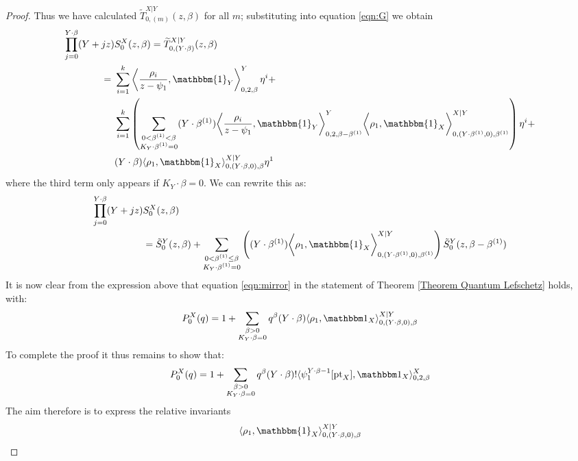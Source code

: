\documentclass[10pt]{amsart}
\newcommand{\pt}{\operatorname{pt}}
\theoremstyle{definition}
\theoremstyle{definition}
\begin{document}
\begin{proof}
Thus we have calculated $\widetilde{T}_{0,(m)}^{X|Y}(z,\beta)$ for all $m$; substituting into equation \eqref{eqn:G} we obtain
\begin{align*} \prod_{j=0}^{Y \cdot \beta} (Y + jz) & S_0^X(z,\beta) = \widetilde{T}_{0,(Y\cdot\beta)}^{X|Y}(z,\beta) \\
= \ & \sum_{i=1}^k \left\langle \dfrac{\rho_i}{z-\psi_1}, \mathbbm{1}_Y \right\rangle_{0,2,\beta}^Y \eta^i + \\
& \sum_{i=1}^k \left( \sum_{\substack{0 < \beta^{(1)} < \beta \\ K_Y \cdot \beta^{(1)}=0}} (Y \cdot \beta^{(1)}) \bigg\langle \dfrac{\rho_i}{z-\psi_1}, \mathbbm{1}_Y \bigg\rangle_{0,2,\beta-\beta^{(1)}}^Y \bigg\langle \rho_1, \mathbbm{1}_X \bigg\rangle_{0,(Y \cdot \beta^{(1)},0),\beta^{(1)}}^{X|Y} \right) \eta^i + \\
& (Y \cdot \beta) \langle \rho_1 , \mathbbm{1}_X \rangle_{0,(Y \cdot \beta,0),\beta}^{X|Y} \eta^1
\end{align*}
where the third term only appears if $K_Y \cdot \beta=0$. We can rewrite this as:
\begin{align*} \prod_{j=0}^{Y \cdot \beta} (Y + jz) & S_0^X(z,\beta) \\
& = \tilde{S}_0^Y(z,\beta) + \sum_{\substack{0 < \beta^{(1)} \leq \beta \\ K_Y \cdot \beta^{(1)}=0}} \left( (Y \cdot \beta^{(1)}) \bigg\langle \rho_1, \mathbbm{1}_X \bigg\rangle_{0,(Y \cdot \beta^{(1)},0),\beta^{(1)}}^{X|Y} \right) \tilde{S}_0^Y(z,\beta-\beta^{(1)})
\end{align*}
It is now clear from the expression above that equation \eqref{eqn:mirror} in the statement of Theorem \ref{Theorem Quantum Lefschetz} holds, with:
\begin{equation*} P_0^X(q) = 1 + \sum_{\substack{\beta>0 \\ K_Y\cdot\beta=0}} q^\beta (Y\cdot\beta) \langle \rho_1,\mathbbm 1_{X}\rangle_{0,(Y\cdot\beta,0),\beta}^{X|Y} \end{equation*}
To complete the proof it thus remains to show that:
\begin{equation*} P_0^X(q) = 1 + \sum_{\substack{\beta>0 \\ K_Y\cdot\beta=0}} q^\beta(Y\cdot\beta)!\langle\psi_1^{Y\cdot\beta-1} [\pt_X],\mathbbm 1_{X}\rangle_{0,2,\beta}^X \end{equation*}
The aim therefore is to express the relative invariants
\begin{equation*} \langle \rho_1 , \mathbbm{1}_X \rangle_{0,(Y\cdot\beta,0),\beta}^{X|Y} \end{equation*}

\end{proof}
\end{document}
